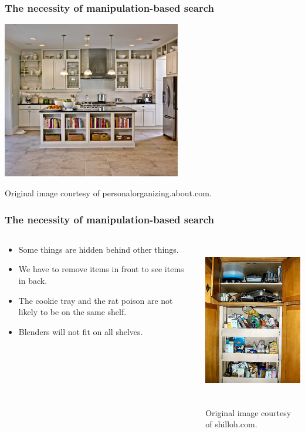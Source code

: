 \begin{frame}
  \frametitle{The necessity of manipulation-based search}
  \begin{center}
    \includegraphics[height=2.7in]{img/kitchen-organization-fake.jpg}

    \tiny{Original image courtesy of personalorganizing.about.com.}
  \end{center}
\end{frame}

\begin{frame}
  \frametitle{The necessity of manipulation-based search}
  \vspace{-0.3in}
  \begin{columns}
    \begin{column}{0.6\textwidth}
      \begin{itemize}
        \item Some things are hidden behind other things.
        \item We have to remove items in front to see items in back.
        \item The cookie tray and the rat poison are not likely to be on the
          same shelf.
        \item Blenders will not fit on all shelves.
      \end{itemize}
    \end{column}
    \begin{column}{0.4\textwidth}
      \begin{center}
        \includegraphics[height=2.7in]{img/kitchen-organization.jpg}

        \tiny{Original image courtesy of shilloh.com.}
      \end{center}
    \end{column}
  \end{columns}
\end{frame}
